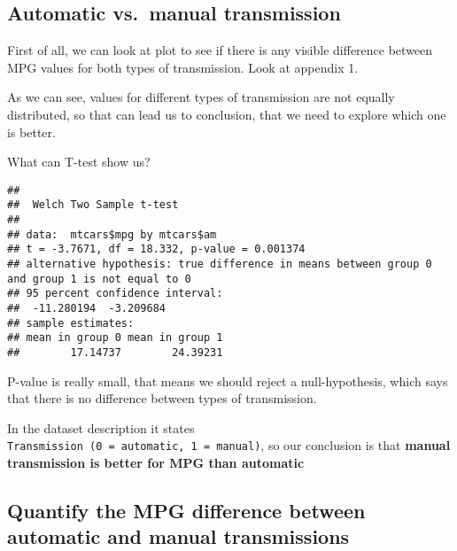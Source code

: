 \documentclass[
]{article}
\newenvironment{Shaded}{\begin{snugshade}}{\end{snugshade}}
\newcommand{\FunctionTok}[1]{\textcolor[rgb]{0.00,0.00,0.00}{#1}}
\newcommand{\NormalTok}[1]{#1}
\newcommand{\SpecialCharTok}[1]{\textcolor[rgb]{0.00,0.00,0.00}{#1}}
\begin{document}
\hypertarget{automatic-vs.-manual-transmission}{%
\subsection{Automatic vs.~manual
transmission}\label{automatic-vs.-manual-transmission}}

First of all, we can look at plot to see if there is any visible
difference between MPG values for both types of transmission. Look at
appendix 1.

As we can see, values for different types of transmission are not
equally distributed, so that can lead us to conclusion, that we need to
explore which one is better.

What can T-test show us?

\begin{Shaded}
\end{Shaded}

\begin{verbatim}
## 
##  Welch Two Sample t-test
## 
## data:  mtcars$mpg by mtcars$am
## t = -3.7671, df = 18.332, p-value = 0.001374
## alternative hypothesis: true difference in means between group 0 and group 1 is not equal to 0
## 95 percent confidence interval:
##  -11.280194  -3.209684
## sample estimates:
## mean in group 0 mean in group 1 
##        17.14737        24.39231
\end{verbatim}

P-value is really small, that means we should reject a null-hypothesis,
which says that there is no difference between types of transmission.

In the dataset description it states
\texttt{Transmission\ (0\ =\ automatic,\ 1\ =\ manual)}, so our
conclusion is that \textbf{manual transmission is better for MPG than
automatic}

\hypertarget{quantify-the-mpg-difference-between-automatic-and-manual-transmissions}{%
\subsection{Quantify the MPG difference between automatic and manual
transmissions}\label{quantify-the-mpg-difference-between-automatic-and-manual-transmissions}}
\end{document}
